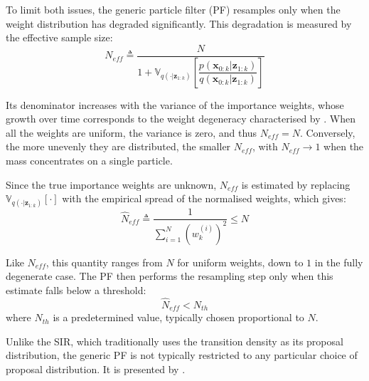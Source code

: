 To limit both issues, the generic particle filter (PF) resamples only when the weight distribution has degraded significantly. This degradation is measured by the effective sample size:
\begin{equation}
	N_{eff}\triangleq\frac{N}{1+\mathbb{V}_{q(\cdot|\mathbf{z}_{1:k})}\left[\dfrac{p(\mathbf{x}_{0:k}|\mathbf{z}_{1:k})}{q(\mathbf{x}_{0:k}|\mathbf{z}_{1:k})}\right]}
\end{equation}

Its denominator increases with the variance of the importance weights, whose growth over time corresponds to the weight degeneracy characterised by . When all the weights are uniform, the variance is zero, and thus $N_{eff}=N$. Conversely, the more unevenly they are distributed, the smaller $N_{eff}$, with $N_{eff}\to1$ when the mass concentrates on a single particle.

Since the true importance weights are unknown, $N_{eff}$ is estimated by replacing $\mathbb{V}_{q(\cdot|\mathbf{z}_{1:k})}[\cdot]$ with the empirical spread of the normalised weights, which gives:
\begin{equation}
	\hat{N}_{eff}\triangleq\frac{1}{\displaystyle\sum_{i=1}^N\left(w_k^{(i)}\right)^2}\leq N
\end{equation}

Like $N_{eff}$, this quantity ranges from $N$ for uniform weights, down to $1$ in the fully degenerate case. The PF then performs the resampling step only when this estimate falls below a threshold:
\begin{equation}
	\hat{N}_{eff}<N_{th}
\end{equation}
where $N_{th}$ is a predetermined value, typically chosen proportional to $N$.

Unlike the SIR, which traditionally uses the transition density as its proposal distribution, the generic PF is not typically restricted to any particular choice of proposal distribution. It is presented by .

